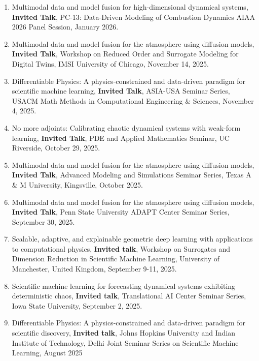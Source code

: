 \documentclass[letterpaper]{article}
\begin{document}
\begin{enumerate}
\item Multimodal data and model fusion for high-dimensional dynamical systems, \textbf{Invited Talk}, PC-13: Data-Driven Modeling of Combustion Dynamics AIAA 2026 Panel Session, January 2026.

\item Multimodal data and model fusion for the atmosphere using diffusion models, \textbf{Invited Talk}, Workshop on Reduced Order and Surrogate Modeling for Digital Twins, IMSI University of Chicago, November 14, 2025.

\item Differentiable Physics: A physics-constrained and data-driven paradigm for scientific machine learning, \textbf{Invited Talk}, ASIA-USA Seminar Series, USACM Math Methods in Computational Engineering \& Sciences, November 4, 2025.

\item No more adjoints: Calibrating chaotic dynamical systems with weak-form learning, \textbf{Invited Talk}, PDE and Applied Mathematics Seminar, UC Riverside, October 29, 2025.

\item Multimodal data and model fusion for the atmosphere using diffusion models, \textbf{Invited Talk}, Advanced Modeling and Simulations Seminar Series, Texas A \& M University, Kingsville, October 2025.

\item Multimodal data and model fusion for the atmosphere using diffusion models, \textbf{Invited Talk}, Penn State University ADAPT Center Seminar Series, September 30, 2025.

\item Scalable, adaptive, and explainable geometric deep learning with applications to computational physics, \textbf{Invited talk}, Workshop on Surrogates and Dimension Reduction in Scientific Machine Learning, University of Manchester, United Kingdom, September 9-11, 2025.

\item Scientific machine learning for forecasting dynamical systems exhibiting deterministic chaos, \textbf{Invited talk}, Translational AI Center Seminar Series, Iowa State University, September 2, 2025.

\item Differentiable Physics: A physics-constrained and data-driven paradigm for scientific discovery, \textbf{Invited talk}, Johns Hopkins University and Indian Institute of Technology, Delhi Joint Seminar Series on Scientific Machine Learning, August 2025


\end{enumerate}
\end{document}
